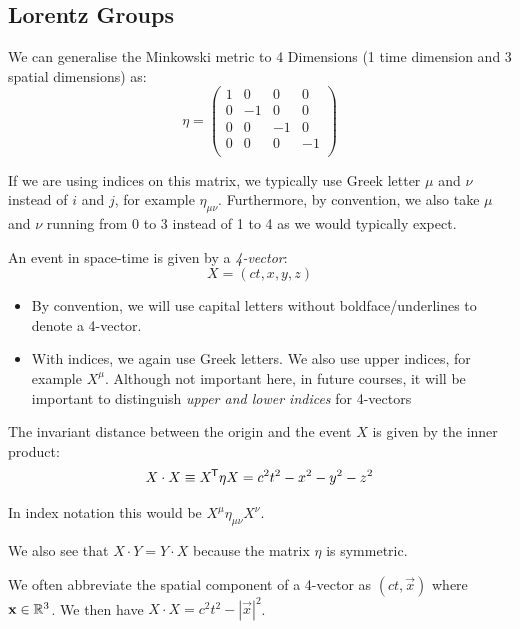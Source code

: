 \documentclass[../main.tex]{subfiles}
\begin{document}
\subsection{Lorentz Groups}
We can generalise the Minkowski metric to 4 Dimensions (1 time dimension and 3 spatial dimensions) as:
\[
  \eta = \begin{pmatrix}
  1 & 0 & 0 & 0 \\
  0 & -1 & 0 & 0 \\
  0 & 0 & -1 & 0 \\
  0 & 0 & 0 & -1 \\
  \end{pmatrix}
\]
\begin{remark}[Notation]
  If we are using indices on this matrix, we typically use Greek letter $\mu$ and $\nu$ instead of $i$ and $j$, for example $\eta_{\mu \nu}$.
  Furthermore, by convention, we also take $\mu$ and $\nu$ running from 0 to 3 instead of 1 to 4 as we would typically expect.
\end{remark}
An event in space-time is given by a \textit{4-vector}:
\[
  X = (ct, x, y, z)
\]
\begin{remark}[Notation]
  \begin{itemize}
    \item By convention, we will use capital letters without boldface/underlines to denote a 4-vector.
    \item With indices, we again use Greek letters.
      We also use upper indices, for example $X^{\mu}$.
      Although not important here, in future courses, it will be important to distinguish \textit{upper and lower indices} for 4-vectors
  \end{itemize}
\end{remark}
The invariant distance between the origin and the event $X$ is given by the inner product:
\begin{equation}
  X \cdot X \equiv X^{{\mkern-1.5mu\mathsf{T}}} \eta X = c^2 t^2 - x^2 - y^2 - z^2 \label{minkowskiDot}
\end{equation}
\begin{remark}
  In index notation this would be $X^{\mu}\eta_{\mu \nu}X^{\nu}$.
\end{remark}
We also see that $X \cdot Y = Y \cdot X$ because the matrix $\eta$ is symmetric.
\begin{remark}[Notation]
  We often abbreviate the spatial component of a 4-vector as $(ct, \vec{x})$ where $\mathbf{\bm{x}} \in \mathbb{R}^3$.
  We then have $X \cdot X = c^2 t^2 - |\vec{x}|^2$.
\end{remark}
\end{document}
